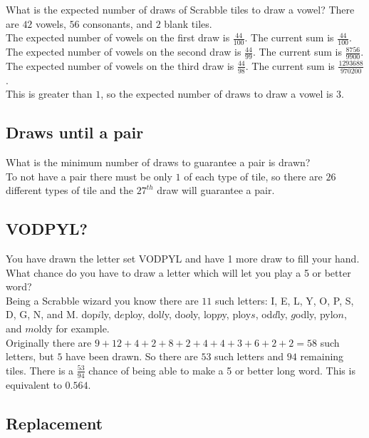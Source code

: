\documentclass{article}
\begin{document}
What is the expected number of draws of Scrabble tiles to draw a vowel?  There are $42$ vowels, $56$ consonants, and $2$ blank tiles.
\\


The expected number of vowels on the first draw is $\frac{44}{100}$.  The current sum is $\frac{44}{100}$.
\\
The expected number of vowels on the second draw is $\frac{44}{99}$.  The current sum is $\frac{8756}{9900}$.
\\
The expected number of vowels on the third draw is $\frac{44}{98}$.  The current sum is $\frac{1293688}{970200}$.
\\
This is greater than $1$, so the expected number of draws to draw a vowel is $3$.

\subsection{Draws until a pair}

What is the minimum number of draws to guarantee a pair is drawn?
\\


To not have a pair there must be only $1$ of each type of tile, so there are $26$ different types of tile and the $27^{th}$ draw will guarantee a pair.

\subsection{VODPYL?}

You have drawn the letter set VODPYL and have 1 more draw to fill your hand. What chance do you have to draw a letter which will let you play a 5 or better word?
\\
Being a Scrabble wizard you know there are $11$ such letters: I, E, L, Y, O, P, S, D, G, N, and M.  dop$i$ly, d$e$ploy, dol$l$y, do$o$ly, lop$p$y, ploy$s$, od$d$ly, $g$odly, pylo$n$, and $m$oldy for example.
\\


Originally there are $9+12+4+2+8+2+4+4+3+6+2+2=58$ such letters, but $5$ have been drawn. So there are $53$ such letters and $94$ remaining tiles.  There is a $\frac{53}{94}$ chance of being able to make a 5 or better long word.  This is equivalent to $0.564$.

\subsection{Replacement}
\end{document}
